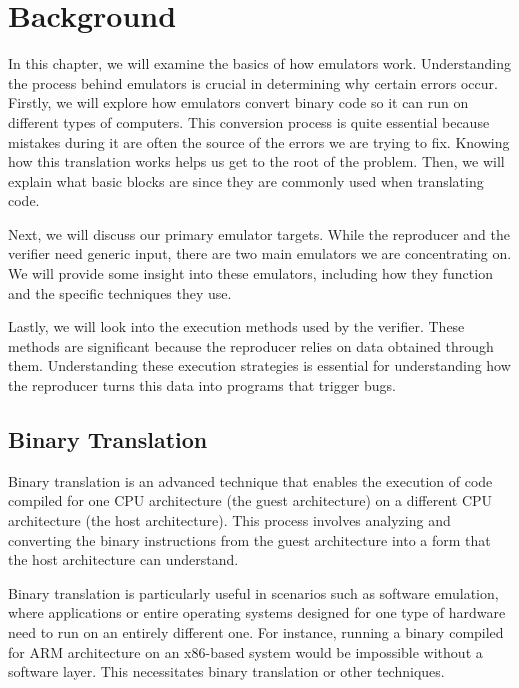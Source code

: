 
\chapter{Background}\label{chapter:background}
In this chapter, we will examine the basics of how emulators work.
Understanding the process behind emulators is crucial in determining why certain errors occur.
Firstly, we will explore how emulators convert binary code so it can run on different types of computers.
This conversion process is quite essential because mistakes during it are often the source of the errors we are trying to fix.
Knowing how this translation works helps us get to the root of the problem.
Then, we will explain what basic blocks are since they are commonly used when translating code.

Next, we will discuss our primary emulator targets.
While the reproducer and the verifier need generic input, there are two main emulators we are concentrating on.
We will provide some insight into these emulators, including how they function and the specific techniques they use.

Lastly, we will look into the execution methods used by the verifier.
These methods are significant because the reproducer relies on data obtained through them.
Understanding these execution strategies is essential for understanding how the reproducer turns this data into programs that trigger bugs.

\section{Binary Translation}
Binary translation is an advanced technique that enables the execution of code compiled for one CPU architecture (the guest architecture) on a different CPU architecture (the host architecture).
This process involves analyzing and converting the binary instructions from the guest architecture into a form that the host architecture can understand. 

Binary translation is particularly useful in scenarios such as software emulation, where applications or entire operating systems designed for one type of hardware need to run on an entirely different one.
For instance, running a binary compiled for ARM architecture on an x86-based system would be impossible without a software layer. This necessitates binary translation or other techniques.

